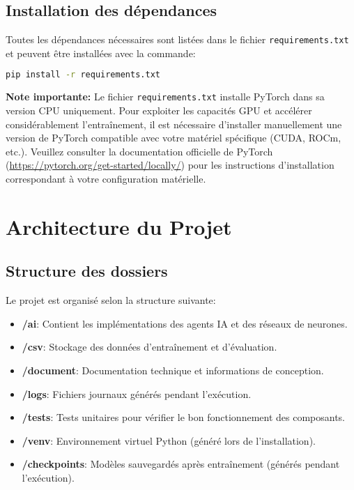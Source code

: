 \documentclass[]{article}
\begin{document}
\subsection{Installation des dépendances}
Toutes les dépendances nécessaires sont listées dans le fichier \texttt{requirements.txt} et peuvent être installées avec la commande:

\begin{lstlisting}[language=bash]
pip install -r requirements.txt
\end{lstlisting}

\textbf{Note importante:} Le fichier \texttt{requirements.txt} installe PyTorch dans sa version CPU uniquement. Pour exploiter les capacités GPU et accélérer considérablement l'entraînement, il est nécessaire d'installer manuellement une version de PyTorch compatible avec votre matériel spécifique (CUDA, ROCm, etc.). Veuillez consulter la documentation officielle de PyTorch (\url{https://pytorch.org/get-started/locally/}) pour les instructions d'installation correspondant à votre configuration matérielle.

\section{Architecture du Projet}

\subsection{Structure des dossiers}
Le projet est organisé selon la structure suivante:

\begin{itemize}
  \item \textbf{/ai}: Contient les implémentations des agents IA et des réseaux de neurones.
  \item \textbf{/csv}: Stockage des données d'entraînement et d'évaluation.
  \item \textbf{/document}: Documentation technique et informations de conception.
  \item \textbf{/logs}: Fichiers journaux générés pendant l'exécution.
  \item \textbf{/tests}: Tests unitaires pour vérifier le bon fonctionnement des composants.
  \item \textbf{/venv}: Environnement virtuel Python (généré lors de l'installation).
  \item \textbf{/checkpoints}: Modèles sauvegardés après entraînement (générés pendant l'exécution).
\end{itemize}
\end{document}
